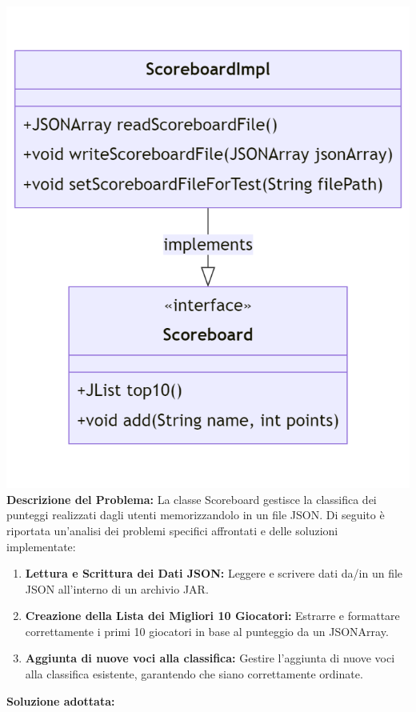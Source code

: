 \documentclass[a4paper,12pt]{report}
\begin{document}
\includegraphics[width=\textwidth]{Scoreboard.png}
\textbf{Descrizione del Problema:} La classe Scoreboard gestisce la classifica dei punteggi realizzati dagli utenti memorizzandolo in un file JSON. Di seguito è riportata un'analisi dei problemi specifici affrontati e delle soluzioni implementate: \newline
\begin{enumerate}


\item \textbf{Lettura e Scrittura dei Dati JSON:} Leggere e scrivere dati da/in un file JSON all'interno di un archivio JAR.
\item \newline \textbf{Creazione della Lista dei Migliori 10 Giocatori:} Estrarre e formattare correttamente i primi 10 giocatori in base al punteggio da un JSONArray.
\item \newline \textbf{Aggiunta di nuove voci alla classifica:} Gestire l'aggiunta di nuove voci alla classifica esistente, garantendo che siano correttamente ordinate.\newline \newline
\end{enumerate}
\textbf{Soluzione adottata:} \newline
\end{document}
